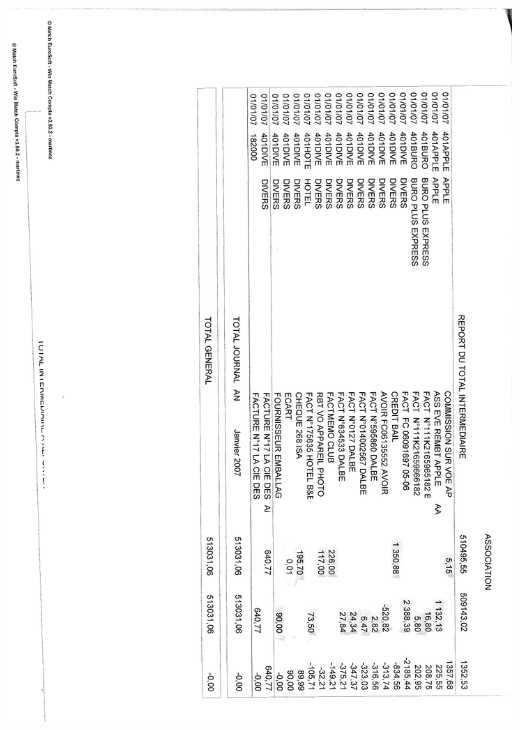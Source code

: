 \begin{center}
\includegraphics[scale=0.7]{annexes/images/bilan_annuel_journaux_b.pdf}
\end{center}
